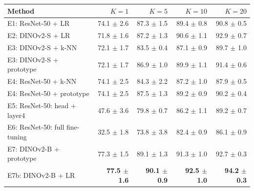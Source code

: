 \begin{tabular}{@{}lrrrr@{}}
\toprule
Method & $K=1$ & $K=5$ & $K=10$ & $K=20$ \\
\midrule
E1: ResNet-50 + LR & 74.1 $\pm$ 2.6 & 87.3 $\pm$ 1.5 & 89.4 $\pm$ 0.8 & 90.8 $\pm$ 0.5 \\
E2: DINOv2-S + LR & 71.8 $\pm$ 1.6 & 87.2 $\pm$ 1.3 & 90.6 $\pm$ 1.1 & 92.9 $\pm$ 0.7 \\
E3: DINOv2-S + k-NN & 72.1 $\pm$ 1.7 & 83.5 $\pm$ 0.4 & 87.1 $\pm$ 0.9 & 89.7 $\pm$ 1.0 \\
E3: DINOv2-S + prototype & 72.1 $\pm$ 1.7 & 86.9 $\pm$ 1.0 & 89.9 $\pm$ 1.1 & 91.4 $\pm$ 0.6 \\
E4: ResNet-50 + k-NN & 74.1 $\pm$ 2.5 & 84.3 $\pm$ 2.2 & 87.2 $\pm$ 1.0 & 87.9 $\pm$ 0.5 \\
E4: ResNet-50 + prototype & 74.1 $\pm$ 2.5 & 87.5 $\pm$ 1.3 & 89.2 $\pm$ 0.9 & 90.2 $\pm$ 0.4 \\
E5: ResNet-50: head + layer4 & 47.6 $\pm$ 3.6 & 79.8 $\pm$ 0.7 & 86.2 $\pm$ 1.1 & 89.2 $\pm$ 0.7 \\
E6: ResNet-50: full fine-tuning & 32.5 $\pm$ 1.8 & 73.8 $\pm$ 3.8 & 82.4 $\pm$ 0.9 & 86.1 $\pm$ 0.9 \\
E7: DINOv2-B + prototype & 77.3 $\pm$ 1.5 & 89.1 $\pm$ 1.3 & 91.3 $\pm$ 1.0 & 92.7 $\pm$ 0.3 \\
E7b: DINOv2-B + LR & \textbf{77.5 $\pm$ 1.6} & \textbf{90.1 $\pm$ 0.9} & \textbf{92.5 $\pm$ 1.0} & \textbf{94.2 $\pm$ 0.3} \\
\bottomrule
\end{tabular}
